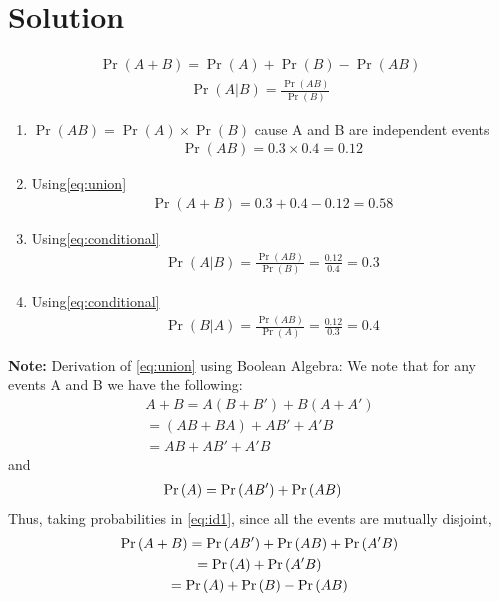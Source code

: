\documentclass[journal,12pt,twocolumn]{IEEEtran}
\begin{document}
\section{Solution}
\solution{}
\begin{align}
    \Pr(A+B) = \Pr(A) + \Pr(B) - \Pr(AB)
    \label{eq:union}
\end{align}
\begin{align}
    \Pr(A|B) = \frac{\Pr(AB)}{\Pr(B)}
    \label{eq:conditional}
\end{align}
\begin{enumerate}[label= (\roman{enumi})]
    \item $\Pr(AB) = \Pr(A) \times \Pr(B)$ cause A and B are independent events\\
    \begin{align}
        \Pr(AB) = 0.3 \times 0.4 = 0.12
    \end{align}
    \item Using\eqref{eq:union}\\
    \begin{align}
        \Pr(A+B) = 0.3 + 0.4 - 0.12 = 0.58
    \end{align}
    \item Using\eqref{eq:conditional}\\
    \begin{align}
        \Pr(A|B) = \frac{\Pr(AB)}{\Pr(B)} = \frac{0.12}{0.4} = 0.3
    \end{align}
    \item Using\eqref{eq:conditional}\\
    \begin{align}
        \Pr(B|A) = \frac{\Pr(AB)}{\Pr(A)} = \frac{0.12}{0.3} = 0.4
    \end{align}
\end{enumerate}
\noindent \textbf{Note:} Derivation of \eqref{eq:union} using Boolean Algebra:
\noindent We note that for any events A and B we have the following:
\begin{multline}
A + B = A(B + B') + B(A + A') \\ 
= (AB + BA) + AB' + A'B \\
= AB + AB' + A'B
\label{eq:id1}
\end{multline}
and
\begin{align}
\Pr\left(A\right) &= \Pr\left(AB'\right) + \Pr\left(AB\right) 
\label{eq:id2}
\end{align}
Thus, taking probabilities in \eqref{eq:id1}, since all the events are mutually disjoint,
\begin{multline}
\Pr\left(A + B\right) = \Pr\left(AB'\right) + \Pr\left(AB\right) + \Pr\left(A'B\right) \\
= \Pr\left(A\right) + \Pr\left(A'B\right) \\
= \Pr\left(A\right) + \Pr\left(B\right) - \Pr\left(AB\right)
\label{eq:derive}
\end{multline}
\end{document}
